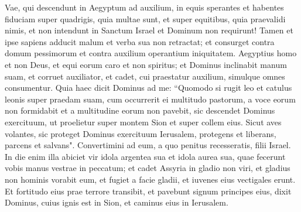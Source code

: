 \begin{biblechapter}  
\verse Vae, qui descendunt in Aegyptum ad auxilium, in equis sperantes et habentes fiduciam super quadrigis, quia multae sunt, et super equitibus, quia praevalidi nimis, et non intendunt in Sanctum Israel et Dominum non requirunt! 
\verse Tamen et ipse sapiens adducit malum et verba sua non retractat; et consurget contra domum pessimorum et contra auxilium operantium iniquitatem. 
\verse Aegyptius homo et non Deus, et equi eorum caro et non spiritus; et Dominus inclinabit manum suam, et corruet auxiliator, et cadet, cui praestatur auxilium, simulque omnes consumentur. 
\verse Quia haec dicit Dominus ad me: “Quomodo si rugit leo et catulus leonis super praedam suam, cum occurrerit ei multitudo pastorum, a voce eorum non formidabit et a multitudine eorum non pavebit, sic descendet Dominus exercituum, ut proelietur super montem Sion et super collem eius. 
\verse Sicut aves volantes, sic proteget Dominus exercituum Ierusalem, protegens et liberans, parcens et salvans". 
\verse Convertimini ad eum, a quo penitus recesseratis, filii Israel. 
\verse In die enim illa abiciet vir idola argentea sua et idola aurea sua, quae fecerunt vobis manus vestrae in peccatum; 
\verse et cadet Assyria in gladio non viri, et gladius non hominis vorabit eum, et fugiet a facie gladii, et iuvenes eius vectigales erunt. 
\verse Et fortitudo eius prae terrore transibit, et pavebunt signum principes eius, dixit Dominus, cuius ignis est in Sion, et caminus eius in Ierusalem. 
\end{biblechapter}

